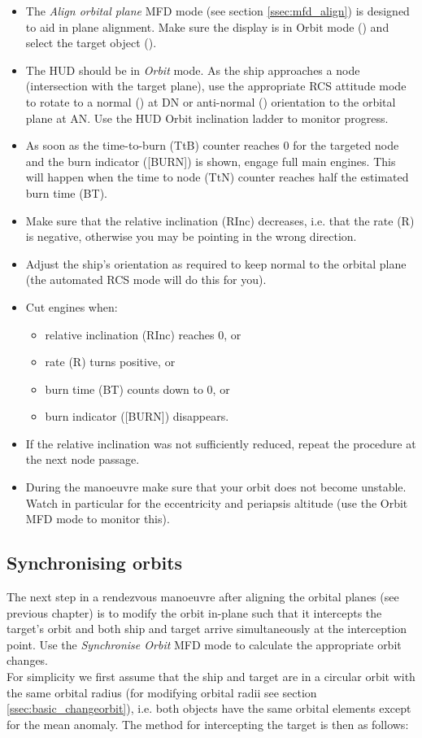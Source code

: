 \documentclass[Orbiter User Manual.tex]{subfiles}
\begin{document}
\begin{itemize}
\item The \textit{Align orbital plane} MFD mode (see section \ref{ssec:mfd_align}) is designed to aid in plane alignment. Make sure the display is in Orbit mode (\Shift{}) and select the target object (\Shift{}).
\item The HUD should be in \textit{Orbit} mode. As the ship approaches a node (intersection with the target plane), use the appropriate RCS attitude mode to rotate to a normal (\keystroke{;}) at DN or anti-normal () orientation to the orbital plane at AN. Use the HUD Orbit inclination ladder to monitor progress.
\item As soon as the time-to-burn (TtB) counter reaches 0 for the targeted node and the burn indicator ([BURN]) is shown, engage full main engines. This will happen when the time to node (TtN) counter reaches half the estimated burn time (BT).
\item Make sure that the relative inclination (RInc) decreases, i.e. that the rate (R) is negative, otherwise you may be pointing in the wrong direction.
\item Adjust the ship's orientation as required to keep normal to the orbital plane (the automated RCS mode will do this for you).
\item Cut engines when:

\begin{itemize}
\item relative inclination (RInc) reaches 0, or
\item rate (R) turns positive, or
\item burn time (BT) counts down to 0, or
\item burn indicator ([BURN]) disappears.
\end{itemize}

\item If the relative inclination was not sufficiently reduced, repeat the procedure at the next node passage.
\item During the manoeuvre make sure that your orbit does not become unstable. Watch in particular for the eccentricity and periapsis altitude (use the Orbit MFD mode to monitor this).
\end{itemize}


\subsection{Synchronising orbits}
\label{ssec:basic_sync}
The next step in a rendezvous manoeuvre after aligning the orbital planes (see previous chapter) is to modify the orbit in-plane such that it intercepts the target's orbit and both ship and target arrive simultaneously at the interception point. Use the \textit{Synchronise Orbit} MFD mode to calculate the appropriate orbit changes.\\
For simplicity we first assume that the ship and target are in a circular orbit with the same orbital radius (for modifying orbital radii see section \ref{ssec:basic_changeorbit}), i.e. both objects have the same orbital elements except for the mean anomaly. The method for intercepting the target is then as follows:
\end{document}

